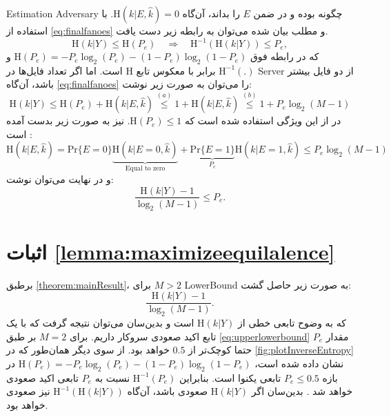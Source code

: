 \gls{Estimation} \gls{Adversary}
چگونه بوده و در ضمن $E$ را بداند، آن‌گاه 
$ \mathrm{H}(k|E,\hat{k})=0$.
با استفاده از 
\eqref{eq:finalfanoes}
و مطلب بیان شده می‌توان به رابطه زیر دست یافت. 
\begin{equation}
\mathrm{H}(k|Y) \leq \mathrm{H}(P_e) \quad \Longrightarrow \quad 
\mathrm{H}^{-1}(\mathrm{H}(k|Y)) \leq P_e,
\end{equation}
که در رابطه فوق
$\mathrm{H}(P_e)=-P_e\log_2(P_e)-(1-P_e)\log_2(1-P_e)$ و $\mathrm{H}^{-1}(.)$
برابر با معکوس تابع
$\mathrm{H}$
است. اما اگر تعداد فایل‌ها در \gls{Server} از دو فایل بیشتر باشد، آن‌گاه
\eqref{eq:finalfanoes}
را می‌توان به صورت زیر نوشت:
\begin{equation}
\mathrm{H}(k|Y) \leq \mathrm{H}(P_e) + \mathrm{H}(k|E,\hat{k})
\stackrel{(a)}{\leq} 1+  \mathrm{H}(k|E,\hat{k})\stackrel{(b)}{\leq} 1+ P_e \log_2{(M-1)}
\end{equation}
در  از این ویژگی استفاده شده است که 
$\mathrm{H}(P_e)\leq 1$. 
نیز به صورت زیر بدست آمده است
\cite[قضیه $2.10.1$]{cover2006elements}:
\begin{equation}
\mathrm{H}(k|E,\hat{k}) =\mathrm{Pr}\{E=0\}\underbrace{\mathrm{H}(k|E=0,\hat{k})}_\textrm{Equal to zero} +\underbrace{\mathrm{Pr}\{E=1\}}_{P_e}\mathrm{H}(k|E=1,\hat{k})
\leq P_e \log_2{(M-1)}
\label{eq:HEKhatK}
\end{equation}
و در نهایت می‌توان نوشت:
\begin{equation}
\frac{\mathrm{H}(k|Y)-1}{\log_2{(M-1)}} \leq P_e.
\end{equation}



\section{اثبات \autoref{lemma:maximizeequilalence}}
\label{subsec:maximizeequilalence}
برطبق
\autoref{theorem:mainResult}،
برای
$M>2$ \gls{LowerBound}
به صورت زیر حاصل گشت:
\begin{equation*}
\frac{\mathrm{H}(k|Y)-1}{\log_2(M-1)}.
\end{equation*}
که به وضوح تابعی خطی از 
$\mathrm{H}(k|Y)$
است و بدین‌سان می‌توان نتیجه گرفت که با یک تابع اکید صعودی سروکار داریم.  برای $M=2$ بر طبق
\eqref{eq:upperlowerbound}
مقدار $P_e$ حتما کوچک‌تر از $0.5$ خواهد بود. از سوی دیگر همان‌طور که در 
\autoref{fig:plotInverseEntropy}
نشان داده شده است، 
$\mathrm{H}(P_e)=-P_e\log_2(P_e)-(1-P_e)\log_2(1-P_e)$
در بازه 
$P_e\leq 0.5$
تابعی یکنوا است. بنابراین 
$\mathrm{H}^{-1}(P_e)$
نسبت به 
$P_e$
تابعی اکید صعودی خواهد شد
\cite[قضیه $3.5.1$]{khuri2003advanced}.
 بدین‌سان اگر 
$\mathrm{H}(k|Y)$
صعودی باشد، آن‌گاه 
$\mathrm{H}^{-1}(\mathrm{H}(k|Y))$
نیز صعودی خواهد بود. 


